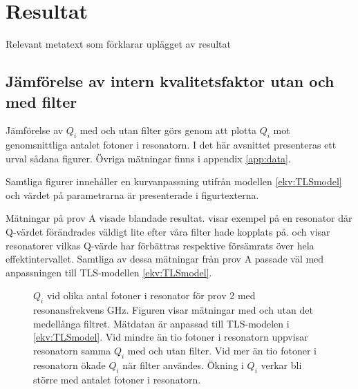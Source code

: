 \documentclass[main.tex]{subfiles}
\begin{document}
\chapter{Resultat}
\label{sec:results}
Relevant metatext som förklarar uplägget av resultat

\section{Jämförelse av intern kvalitetsfaktor utan och med filter}
Jämförelse av $Q_i$ med och utan filter görs genom att plotta $Q_i$ mot genomsnittliga antalet fotoner i resonatorn. I det här avsnittet presenteras ett urval sådana figurer. Övriga mätningar finns i appendix \ref{app:data}.

Samtliga figurer innehåller en kurvanpassning utifrån modellen \ref{ekv:TLSmodel} och värdet på parametrarna är presenterade i figurtexterna.

Mätningar på prov A visade blandade resultat.  visar exempel på en resonator där Q-värdet förändrades väldigt lite efter våra filter hade kopplats på.  och  visar resonatorer vilkas Q-värde har förbättras respektive försämrats över hela effektintervallet. Samtliga av dessa mätningar från prov A passade väl med anpassningen till TLS-modellen \ref{ekv:TLSmodel}.


\begin{figure}[H]
  \centering
  \setlength{}
  \setlength\figureheight{12em}
  
  \caption{$Q_i$ vid olika antal fotoner i resonator för prov 2 med resonansfrekvens \unit[5,732]{GHz}. Figuren visar mätningar med och utan det medellånga filtret. Mätdatan är anpassad till TLS-modelen i \ref{ekv:TLSmodel}. Vid mindre än tio fotoner i resonatorn uppvisar resonatorn samma $Q_i$ med och utan filter. Vid mer än tio fotoner i resonatorn ökade $Q_i$ när filter användes. Ökning i $Q_i$ verkar bli större med antalet fotoner i resonatorn.}
\end{figure}
\end{document}
